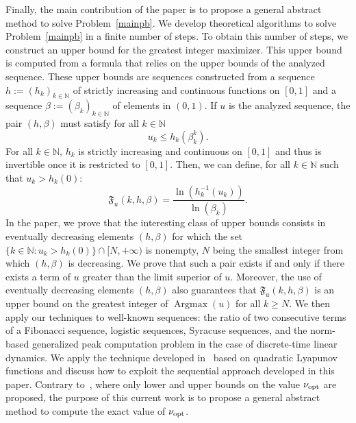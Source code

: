 \documentclass{article}
\def\Fu{\mathfrak{F}_u}
\def\nn{\mathbb N}
\def\agmx{\operatorname{Argmax}}
\def\blue#1{#1}
\begin{document}
	Finally, the main contribution of the paper is to propose a general abstract method to solve Problem~\ref{mainpb}. We develop theoretical algorithms to solve Problem~\ref{mainpb} in a finite number of steps. To obtain this number of steps, we construct an upper bound for the greatest integer maximizer. This upper bound is computed from a formula that relies on the upper bounds of the analyzed sequence. These upper bounds are sequences constructed from a sequence $h:=(h_k)_{k\in\nn}$ of strictly increasing and continuous functions on $[0,1]$ and a sequence $\beta:=(\beta_k)_{k\in\nn}$ of elements in $(0,1)$. \blue{If $u$ is the analyzed sequence}, the pair $(h,\beta)$ must satisfy for all $k\in\nn$
	\begin{equation}
	\label{eq:upperbound}
	\blue{u_k\leq h_k(\beta_k^k)}.
	\end{equation}
	For all $k\in\nn$, $h_k$ is strictly increasing and continuous on $[0,1]$ and thus is invertible once it is restricted to $[0,1]$. Then, we can define, for all $k\in\nn$ such that $u_k>h_k(0)$:
	\begin{equation}
	\label{eq:upperboundfct}
	\Fu(k,h,\beta)=\dfrac{\ln(h_{k}^{-1}(u_k))}{\ln(\beta_k)}.
	\end{equation}
	In the paper, we prove that the interesting class of upper bounds consists in eventually decreasing  
	elements $(h,\beta)$ for which the set $\{k\in\nn : u_k>h_k(0)\}\cap [N,+\infty)$ is nonempty, $N$ being the smallest integer from which $(h,\beta)$ is decreasing. We prove that such a pair exists if and only if there exists a term of $u$ greater than the limit superior of $u$. Moreover, the use of eventually decreasing elements $(h,\beta)$ also guarantees that $\Fu(k,h,\beta)$ is an upper bound on the greatest integer of $\agmx(u)$ for all $k\geq N$. We then apply our techniques to well-known sequences: the ratio of two consecutive terms of a Fibonacci sequence, logistic sequences, Syracuse sequences, and the norm-based generalized peak computation problem in the case of discrete-time linear dynamics. We apply the technique developed in~\cite{adje13052025} \blue{based on} quadratic Lyapunov functions and discuss how to \blue{exploit} the sequential approach developed in this paper. Contrary to~\cite{dowler2013bounding,polyak2018peak}, where only lower and upper bounds on the value $\nu_{\rm opt}$ are proposed, \blue{the purpose of this current work is to propose a general abstract method to} compute the exact value of $\nu_{\rm opt}$.
	
\end{document}
